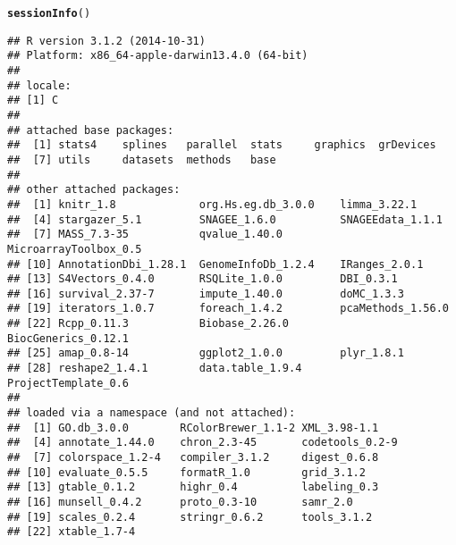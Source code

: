 \documentclass{article}\usepackage[]{graphicx}\usepackage[]{color}
\makeatletter
\newcommand{\hlstd}[1]{\textcolor[rgb]{0.345,0.345,0.345}{#1}}%
\newcommand{\hlkwd}[1]{\textcolor[rgb]{0.737,0.353,0.396}{\textbf{#1}}}%
\newenvironment{kframe}{%
 \def\at@end@of@kframe{}%
 \ifinner\ifhmode%
  \def\at@end@of@kframe{\end{minipage}}%
  \begin{minipage}{\columnwidth}%
 \fi\fi%
 \def\FrameCommand##1{\hskip\@totalleftmargin \hskip-\fboxsep
 \colorbox{shadecolor}{##1}\hskip-\fboxsep
     \hskip-\linewidth \hskip-\@totalleftmargin \hskip\columnwidth}%
 \MakeFramed {\advance\hsize-\width
   \@totalleftmargin\z@ \linewidth\hsize
   \@setminipage}}%
 {\par\unskip\endMakeFramed%
 \at@end@of@kframe}
\newenvironment{knitrout}{}{} %
\makeatother
\begin{document}
\begin{knitrout}\small
{}\color{fgcolor}\begin{kframe}
\begin{alltt}
\hlkwd{sessionInfo} \hlstd{()}
\end{alltt}
\begin{verbatim}
## R version 3.1.2 (2014-10-31)
## Platform: x86_64-apple-darwin13.4.0 (64-bit)
## 
## locale:
## [1] C
## 
## attached base packages:
##  [1] stats4    splines   parallel  stats     graphics  grDevices
##  [7] utils     datasets  methods   base     
## 
## other attached packages:
##  [1] knitr_1.8             org.Hs.eg.db_3.0.0    limma_3.22.1         
##  [4] stargazer_5.1         SNAGEE_1.6.0          SNAGEEdata_1.1.1     
##  [7] MASS_7.3-35           qvalue_1.40.0         MicroarrayToolbox_0.5
## [10] AnnotationDbi_1.28.1  GenomeInfoDb_1.2.4    IRanges_2.0.1        
## [13] S4Vectors_0.4.0       RSQLite_1.0.0         DBI_0.3.1            
## [16] survival_2.37-7       impute_1.40.0         doMC_1.3.3           
## [19] iterators_1.0.7       foreach_1.4.2         pcaMethods_1.56.0    
## [22] Rcpp_0.11.3           Biobase_2.26.0        BiocGenerics_0.12.1  
## [25] amap_0.8-14           ggplot2_1.0.0         plyr_1.8.1           
## [28] reshape2_1.4.1        data.table_1.9.4      ProjectTemplate_0.6  
## 
## loaded via a namespace (and not attached):
##  [1] GO.db_3.0.0        RColorBrewer_1.1-2 XML_3.98-1.1      
##  [4] annotate_1.44.0    chron_2.3-45       codetools_0.2-9   
##  [7] colorspace_1.2-4   compiler_3.1.2     digest_0.6.8      
## [10] evaluate_0.5.5     formatR_1.0        grid_3.1.2        
## [13] gtable_0.1.2       highr_0.4          labeling_0.3      
## [16] munsell_0.4.2      proto_0.3-10       samr_2.0          
## [19] scales_0.2.4       stringr_0.6.2      tools_3.1.2       
## [22] xtable_1.7-4
\end{verbatim}
\end{kframe}
\end{knitrout}
\end{document}
